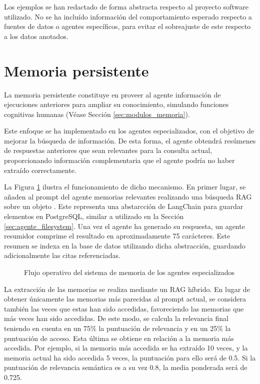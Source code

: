 Los ejemplos se han redactado de forma abstracta respecto al proyecto software utilizado. No se ha incluído información del comportamiento esperado respecto a fuentes de datos o agentes específicos, para evitar el sobreajuste de este respecto a los datos anotados. 

\section{Memoria persistente}
La memoria persistente constituye en proveer al agente información de ejecuciones anteriores para ampliar su conocimiento, simulando funciones cognitivas humanas (Véase Sección \ref{sec:modulos_memoria}). 

Este enfoque se ha implementado en los agentes especializados, con el objetivo de mejorar la búsqueda de información. De esta forma, el agente obtendrá resúmenes de respuestas anteriores que sean relevantes para la consulta actual, proporcionando información complementaria que el agente podría no haber extraído correctamente. 

La Figura \ref{fig:mem_1} ilustra el funcionamiento de dicho mecanismo. En primer lugar, se añaden al prompt del agente memorias relevantes realizando una búsqueda RAG sobre un objeto . Este representa una abstarcción de LangChain para guardar elementos en PostgreSQL, similar a  utilizado en la Sección \ref{sec:agente_filesystem}. Una vez el agente ha generado su respuesta, un agente resumidor comprime el resultado en aproximadamente 75 carácteres. Este resumen se indexa en la base de datos utilizando dicha abstracción, guardando adicionalmente las citas referenciadas.

\begin{figure}[h]
\centering
{}
\caption{Flujo operativo del sistema de memoria de los agentes especializados}
\label{fig:mem_1}
\end{figure}

La extracción de las memorias se realiza mediante un RAG híbrido. En lugar de obtener únicamente las memorias más parecidas al prompt actual, se considera también las veces que estas han sido accedidas, favoreciendo las memorias que más veces han sido accedidas. De este modo, se calcula la relevancia final teniendo en cuenta en un 75\% la puntuación de relevancia y en un 25\% la puntuación de acceso. Esta última se obtiene en relación a la memoria más accedida. Por ejemplo, si la memoria más accedida se ha extraído 10 veces, y la memoria actual ha sido accedida 5 veces, la puntuación para ello será de 0.5. Si la puntuación de relevancia semántica es a su vez 0.8, la media ponderada será de 0.725.

